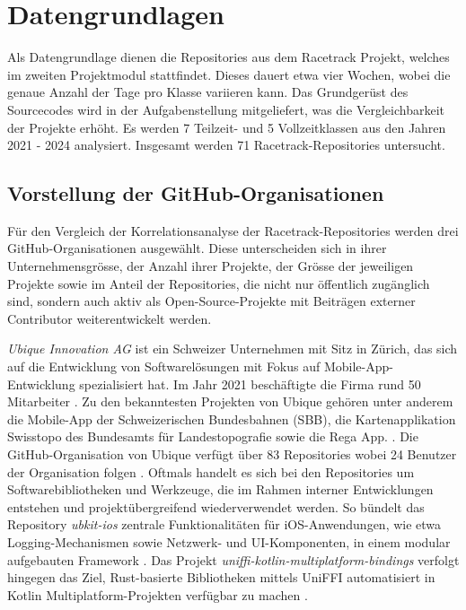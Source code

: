 \section{Datengrundlagen}
\label{sec:Datengrundlagen}
Als Datengrundlage dienen die Repositories aus dem Racetrack Projekt, welches im zweiten Projektmodul stattfindet. Dieses dauert etwa vier Wochen, wobei die genaue Anzahl der Tage pro Klasse variieren kann. Das Grundgerüst des Sourcecodes wird in der Aufgabenstellung mitgeliefert, was die Vergleichbarkeit der Projekte erhöht. Es werden 7 Teilzeit- und 5 Vollzeitklassen aus den Jahren 2021 - 2024 analysiert. Insgesamt werden 71 Racetrack-Repositories untersucht. 

\subsection{Vorstellung der GitHub-Organisationen}
\label{sec:VorstellungGithubOrgs}
Für den Vergleich der Korrelationsanalyse der Racetrack-Repositories werden drei GitHub-Organisationen ausgewählt. Diese unterscheiden sich in ihrer Unternehmensgrösse, der Anzahl ihrer Projekte, der Grösse der jeweiligen Projekte sowie im Anteil der Repositories, die nicht nur öffentlich zugänglich sind, sondern auch aktiv als Open-Source-Projekte mit Beiträgen externer Contributor weiterentwickelt werden.

\textit{Ubique Innovation AG} ist ein Schweizer Unternehmen mit Sitz in Zürich, das sich auf die Entwicklung von Softwarelösungen mit Fokus auf Mobile-App-Entwicklung spezialisiert hat. Im Jahr 2021 beschäftigte die Firma rund 50 Mitarbeiter \cite{noauthor_mathias_2021}. Zu den bekanntesten Projekten von Ubique gehören unter anderem die Mobile-App der Schweizerischen Bundesbahnen (SBB), die Kartenapplikation Swisstopo des Bundesamts für Landestopografie sowie die Rega App. \parencite{noauthor_apps_nodate}. Die GitHub-Organisation von Ubique verfügt über 83 Repositories wobei 24 Benutzer der Organisation folgen \parencite{noauthor_ubique_nodate}. Oftmals handelt es sich bei den Repositories um Softwarebibliotheken und Werkzeuge, die im Rahmen interner Entwicklungen entstehen und projektübergreifend wiederverwendet werden. So bündelt das Repository \textit{ubkit-ios} zentrale Funktionalitäten für iOS-Anwendungen, wie etwa Logging-Mechanismen sowie Netzwerk- und UI-Komponenten, in einem modular aufgebauten Framework \parencite{noauthor_ubiqueinnovationubkit-ios_2025}. Das Projekt \textit{uniffi-kotlin-multiplatform-bindings} verfolgt hingegen das Ziel, Rust-basierte Bibliotheken mittels UniFFI automatisiert in Kotlin Multiplatform-Projekten verfügbar zu machen \parencite{noauthor_ubiqueinnovationuniffi-kotlin-multiplatform-bindings_nodate}.



